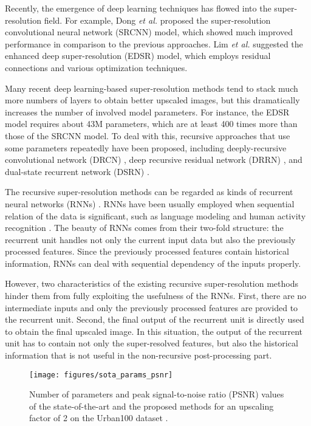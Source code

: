 \documentclass[runningheads]{llncs}
\begin{document}
Recently, the emergence of deep learning techniques has flowed into the super-resolution field.
For example, Dong \textit{et al.} \cite{dong2014learning} proposed the super-resolution convolutional neural network (SRCNN) model, which showed much improved performance in comparison to the previous approaches.
Lim \textit{et al.} \cite{lim2017enhanced} suggested the enhanced deep super-resolution (EDSR) model, which employs residual connections and various optimization techniques.

Many recent deep learning-based super-resolution methods tend to stack much more numbers of layers to obtain better upscaled images, but this dramatically increases the number of involved model parameters.
For instance, the EDSR model requires about 43M parameters, which are at least 400 times more than those of the SRCNN model.
To deal with this, recursive approaches that use some parameters repeatedly have been proposed, including deeply-recursive convolutional network (DRCN) \cite{kim2016deeply}, deep recursive residual network (DRRN) \cite{tai2017image}, and dual-state recurrent network (DSRN) \cite{han2018image}.

The recursive super-resolution methods can be regarded as kinds of recurrent neural networks (RNNs) \cite{han2018image}.
RNNs have been usually employed when sequential relation of the data is significant, such as language modeling \cite{vinyals2015show} and human activity recognition \cite{choi2017impact}.
The beauty of RNNs comes from their two-fold structure: the recurrent unit handles not only the current input data but also the previously processed features.
Since the previously processed features contain historical information, RNNs can deal with sequential dependency of the inputs properly.

However, two characteristics of the existing recursive super-resolution methods hinder them from fully exploiting the usefulness of the RNNs.
First, there are no intermediate inputs and only the previously processed features are provided to the recurrent unit.
Second, the final output of the recurrent unit is directly used to obtain the final upscaled image.
In this situation, the output of the recurrent unit has to contain not only the super-resolved features, but also the historical information that is not useful in the non-recursive post-processing part.

\begin{figure}[t]
	\begin{center}
		\centering
		\texttt{[image: figures/sota\_params\_psnr]}
	\end{center}
	\caption{Number of parameters and peak signal-to-noise ratio (PSNR) values of the state-of-the-art and the proposed methods for an upscaling factor of 2 on the Urban100 dataset \cite{huang2015single}.}
	\label{fig:params_psnr_graph}
\end{figure}
\end{document}
